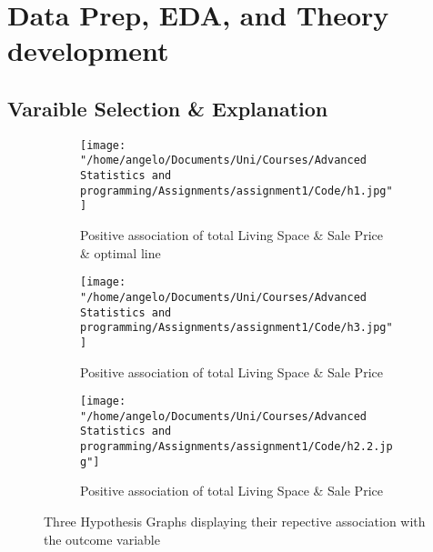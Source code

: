 \documentclass[a4paper]{article}
\begin{document}
\section{Data Prep, EDA, and Theory development}
\subsection{Varaible Selection \& Explanation}


\begin{figure}
     \centering
     \begin{subfigure}[b]{0.45\textwidth}
         \centering
         \texttt{[image: "/home/angelo/Documents/Uni/Courses/Advanced Statistics and programming/Assignments/assignment1/Code/h1.jpg"]}
         \caption{Positive association of total Living Space \& Sale Price \& optimal line}
         \label{fig:y equals x}
     \end{subfigure}
     \hfill
     \begin{subfigure}[b]{0.45\textwidth}
         \centering
         \texttt{[image: "/home/angelo/Documents/Uni/Courses/Advanced Statistics and programming/Assignments/assignment1/Code/h3.jpg"]}
         \caption{Positive association of total Living Space \& Sale Price}
         \label{fig:three sin x}
     \end{subfigure}
     \hfill
     \begin{subfigure}[b]{0.45\textwidth}
         \centering
         \texttt{[image: "/home/angelo/Documents/Uni/Courses/Advanced Statistics and programming/Assignments/assignment1/Code/h2.2.jpg"]}
         \caption{Positive association of total Living Space \& Sale Price}
         \label{fig:five over x}
     \end{subfigure}
        \caption{Three Hypothesis Graphs displaying their repective association with the outcome variable}
        \label{fig:three graphs}
\end{figure}





















\begin{center}
\end{center}
\end{document}
